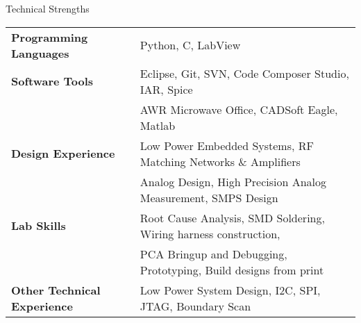 \documentclass{resume} %
\begin{document}
\begin{rSection}{Technical Strengths}

\begin{tabular}{ @{} >{\bfseries}l @{\hspace{6ex}} l }
Programming Languages & Python, C, LabView  \smallskip \\

Software Tools & Eclipse, Git, SVN, Code Composer Studio, IAR, Spice\\ 
 & AWR Microwave Office, CADSoft Eagle, Matlab \smallskip \\

Design Experience & Low Power Embedded Systems, RF Matching Networks \& Amplifiers\\
 & Analog Design, High Precision Analog Measurement, SMPS Design \smallskip \\
 
Lab Skills & Root Cause Analysis, SMD Soldering, Wiring harness construction,\\
& PCA Bringup and Debugging, Prototyping, Build designs from print\smallskip \\
 
Other Technical Experience &  Low Power System Design, I2C, SPI, JTAG, Boundary Scan \\
\end{tabular}

\end{rSection}
\medskip

\end{document}
